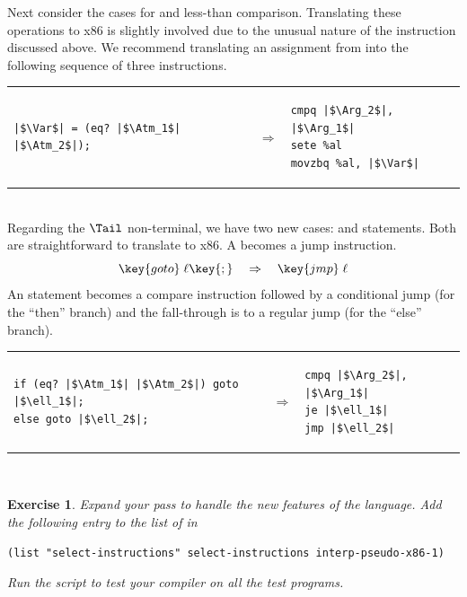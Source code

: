 \documentclass[11pt]{book}
\newtheorem{exercise}[theorem]{Exercise}
\begin{document}
Next consider the cases for  and less-than comparison.
Translating these operations to x86 is slightly involved due to the
unusual nature of the  instruction discussed above.  We
recommend translating an assignment from  into the following
sequence of three instructions. \\
\begin{tabular}{lll}
\begin{minipage}{0.4\textwidth}
\begin{lstlisting}
|$\Var$| = (eq? |$\Atm_1$| |$\Atm_2$|);
\end{lstlisting}
\end{minipage}
&
$\Rightarrow$
&
\begin{minipage}{0.4\textwidth}
\begin{lstlisting}
cmpq |$\Arg_2$|, |$\Arg_1$|
sete %al
movzbq %al, |$\Var$|
\end{lstlisting}
\end{minipage}
\end{tabular}  \\

Regarding the $\Tail$ non-terminal, we have two new cases: 
and  statements. Both are straightforward to translate to
x86. A  becomes a jump instruction.
\[
\key{goto}\; \ell\key{;} \quad \Rightarrow \quad \key{jmp}\;\ell
\]
An  statement becomes a compare instruction followed by a
conditional jump (for the ``then'' branch) and the fall-through is to
a regular jump (for the ``else'' branch).\\
\begin{tabular}{lll}
\begin{minipage}{0.4\textwidth}
\begin{lstlisting}
if (eq? |$\Atm_1$| |$\Atm_2$|) goto |$\ell_1$|;
else goto |$\ell_2$|;
\end{lstlisting}
\end{minipage}
&
$\Rightarrow$
&
\begin{minipage}{0.4\textwidth}
\begin{lstlisting}
cmpq |$\Arg_2$|, |$\Arg_1$|
je |$\ell_1$|
jmp |$\ell_2$|
\end{lstlisting}
\end{minipage}
\end{tabular}  \\

\begin{exercise}\normalfont
Expand your  pass to handle the new features
of the \LangIf{} language.
%
Add the following entry to the list of  in
\begin{lstlisting}
(list "select-instructions" select-instructions interp-pseudo-x86-1)
\end{lstlisting}
%
Run the script to test your compiler on all the test programs.
\end{exercise}
\end{document}
